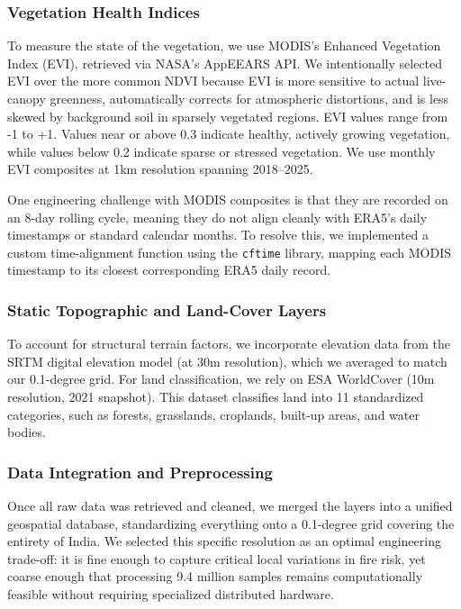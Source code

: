 \subsubsection{Vegetation Health Indices}

To measure the state of the vegetation, we use MODIS's Enhanced Vegetation Index (EVI), retrieved via NASA's AppEEARS API. We intentionally selected EVI over the more common NDVI because EVI is more sensitive to actual live-canopy greenness, automatically corrects for atmospheric distortions, and is less skewed by background soil in sparsely vegetated regions. EVI values range from -1 to +1. Values near or above 0.3 indicate healthy, actively growing vegetation, while values below 0.2 indicate sparse or stressed vegetation. We use monthly EVI composites at 1km resolution spanning 2018--2025. 

One engineering challenge with MODIS composites is that they are recorded on an 8-day rolling cycle, meaning they do not align cleanly with ERA5's daily timestamps or standard calendar months. To resolve this, we implemented a custom time-alignment function using the \texttt{cftime} library, mapping each MODIS timestamp to its closest corresponding ERA5 daily record.

\subsubsection{Static Topographic and Land-Cover Layers}

To account for structural terrain factors, we incorporate elevation data from the SRTM digital elevation model (at 30m resolution), which we averaged to match our 0.1-degree grid. For land classification, we rely on ESA WorldCover (10m resolution, 2021 snapshot). This dataset classifies land into 11 standardized categories, such as forests, grasslands, croplands, built-up areas, and water bodies.

\subsubsection{Data Integration and Preprocessing}

Once all raw data was retrieved and cleaned, we merged the layers into a unified geospatial database, standardizing everything onto a 0.1-degree grid covering the entirety of India. We selected this specific resolution as an optimal engineering trade-off: it is fine enough to capture critical local variations in fire risk, yet coarse enough that processing 9.4 million samples remains computationally feasible without requiring specialized distributed hardware.

